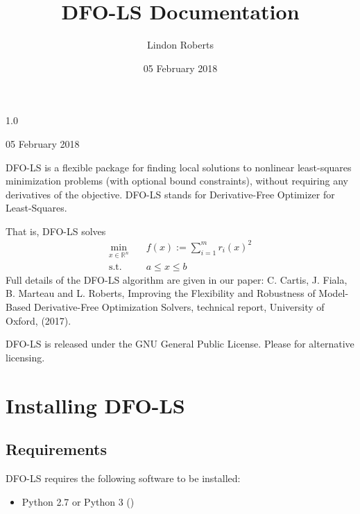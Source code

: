 \documentclass[letterpaper,10pt,english]{sphinxmanual}
\title{DFO-LS Documentation}
\date{05 February 2018}
\author{Lindon Roberts}
\begin{document}
\maketitle
\sphinxtableofcontents
{}\label{\detokenize{index::doc}}


 1.0

 05 February 2018

 

DFO-LS is a flexible package for finding local solutions to nonlinear least-squares minimization problems (with optional bound constraints), without requiring any derivatives of the objective. DFO-LS stands for Derivative-Free Optimizer for Least-Squares.

That is, DFO-LS solves
\begin{equation*}
\begin{split}\min_{x\in\mathbb{R}^n}  &\quad  f(x) := \sum_{i=1}^{m}r_{i}(x)^2 \\
\text{s.t.} &\quad  a \leq x \leq b\end{split}
\end{equation*}
Full details of the DFO-LS algorithm are given in our paper: C. Cartis, J. Fiala, B. Marteau and L. Roberts, Improving the Flexibility and Robustness of Model-Based Derivative-Free Optimization Solvers, technical report, University of Oxford, (2017).

DFO-LS is released under the GNU General Public License. Please  for alternative licensing.


\chapter{Installing DFO-LS}
\label{\detokenize{install:dfo-ls-derivative-free-optimizer-for-least-squares-minimization}}\label{\detokenize{install::doc}}\label{\detokenize{install:installing-dfo-ls}}

\section{Requirements}
\label{\detokenize{install:requirements}}
DFO-LS requires the following software to be installed:
\begin{itemize}
\item {} 
Python 2.7 or Python 3 ()

\end{itemize}
\end{document}
